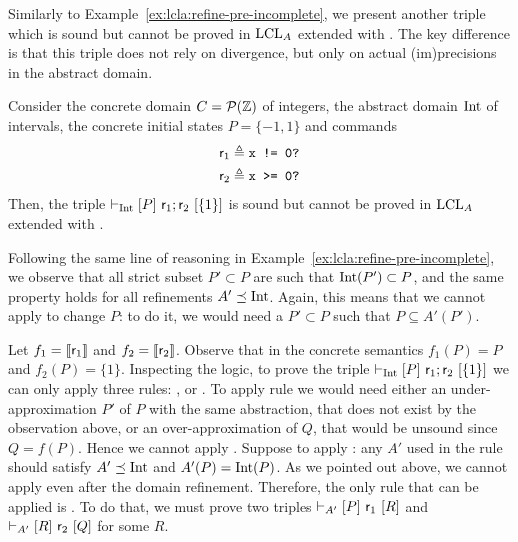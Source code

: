 \begin{example}\label{ex:app:refine-pre-incomplete-2-appendix}
	Similarly to Example~\ref{ex:lcla:refine-pre-incomplete}, we present another triple which is sound but cannot be proved in $\text{LCL}_A$ extended with . The key difference is that this triple does not rely on divergence, but only on actual (im)precisions in the abstract domain.

	Consider the concrete domain $C = \mathcal{P}(\mathbb{Z})$ of integers, the abstract domain $\text{Int}$ of intervals, the concrete initial states $P = \{ -1, 1 \}$ and commands
	\begin{align*}
		\mathsf{r}_1 & \triangleq \texttt{x != 0?} \\
		\mathsf{r}_2 & \triangleq \texttt{x >= 0?}
	\end{align*}
	Then, the triple $\vdash_{\text{Int}}\nobreak[P]~\mathsf{r}_1; \mathsf{r}_2~[\{ 1 \}]$ is sound but cannot be proved in $\text{LCL}_A$ extended with .

	Following the same line of reasoning in Example~\ref{ex:lcla:refine-pre-incomplete}, we observe that all strict subset $P' \subset P$ are such that $\text{Int}(P') \subset P$, and the same property holds for all refinements $A' \preceq \text{Int}$. Again, this means that we cannot apply  to change $P$: to do it, we would need a $P' \subset P$ such that $P \subseteq A'(P')$.

	Let $f_1 = \llbracket\mathsf{r}_1\rrbracket$ and $f_2 = \llbracket\mathsf{r}_2\rrbracket$. Observe that in the concrete semantics $f_1(P) = P$ and $f_2(P) = \{ 1 \}$.
	Inspecting the logic, to prove the triple $\vdash_{\text{Int}}\nobreak[P]~\mathsf{r}_1; \mathsf{r}_2~[\{ 1 \}]$ we can only apply three rules: ,  or .
	To apply rule  we would need either an under\hyp{}approximation $P'$ of $P$ with the same abstraction, that does not exist by the observation above, or an over\hyp{}approximation of $Q$, that would be unsound since $Q = f(P)$. Hence we cannot apply . Suppose to apply : any $A'$ used in the rule should satisfy $A' \preceq \text{Int}$ and $A'(P) = \text{Int}(P)$. As we pointed out above, we cannot apply  even after the domain refinement. Therefore, the only rule that can be applied is . To do that, we must prove two triples $\vdash_{A'}\nobreak[P]~\mathsf{r}_1~[R]$ and $\vdash_{A'}\nobreak[R]~\mathsf{r}_2~[Q]$ for some $R$.


\end{example}
